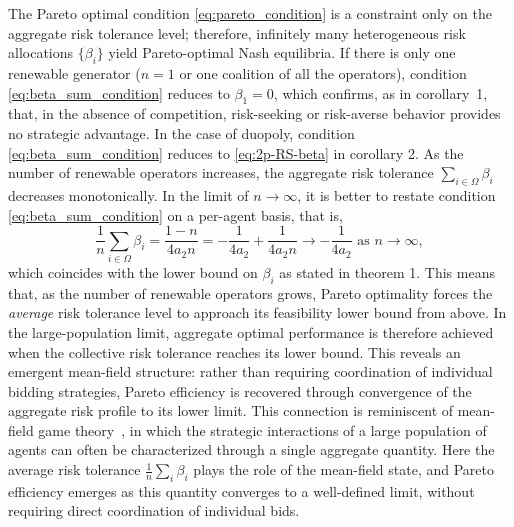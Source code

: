 \documentclass[conference]{IEEEtran}
\begin{document}
The Pareto optimal condition \eqref{eq:pareto_condition} is a constraint only on the aggregate risk tolerance level; therefore, infinitely many heterogeneous risk allocations $\{\beta_i\}$ yield Pareto-optimal Nash equilibria.
If there is only one renewable generator ($n=1$ or one coalition of all the operators), condition \eqref{eq:beta_sum_condition} reduces to $\beta_1 = 0$,
which confirms, as in corollary~1, that, in the absence of competition, risk-seeking or risk-averse behavior provides no strategic advantage. In the case of duopoly, condition \eqref{eq:beta_sum_condition} reduces to \eqref{eq:2p-RS-beta} in corollary 2. As the number of renewable operators increases, the aggregate risk tolerance $\sum_{i\in\Omega} \beta_i$ decreases monotonically. In the limit of $n\to\infty$, it is better to restate condition \eqref{eq:beta_sum_condition} on a per-agent basis, that is, 
\[
\frac{1}{n}\sum_{i\in\Omega} \beta_i
= \frac{1-n}{4a_2 n}
= -\frac{1}{4a_2} + \frac{1}{4a_2 n} \to 
 -\frac{1}{4a_2} \mbox{ as } n\to\infty, 
\]
which coincides with the lower bound on $\beta_i$ as stated in theorem 1. This means that, as the number of renewable operators grows, Pareto optimality forces the \emph{average} risk tolerance level to approach its feasibility lower bound from above. In the large-population limit, aggregate optimal performance is therefore achieved when the collective risk tolerance reaches its lower bound. This reveals an emergent mean-field structure: rather than requiring coordination of individual bidding strategies, Pareto efficiency is recovered through convergence of the aggregate risk profile to its lower limit. This connection is reminiscent of mean-field game theory~\cite{huang2006large,lasry2007mean}, in which the strategic interactions of a large population of agents can often be characterized through a single aggregate quantity. Here the average risk tolerance $\frac{1}{n}\sum_i\beta_i$ plays the role of the mean-field state, and Pareto efficiency emerges as this quantity converges to a well-defined limit, without requiring direct coordination of individual bids. %
\end{document}
